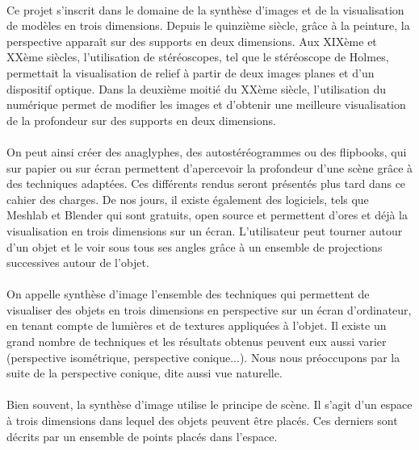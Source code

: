 \paragraph{}
	Ce projet s’inscrit dans le domaine de la synthèse d’images et de la visualisation de modèles en trois dimensions. Depuis le quinzième siècle, grâce à la peinture, la perspective apparaît sur des supports en deux dimensions. Aux XIXème et XXème siècles, l’utilisation de stéréoscopes, tel que le stéréoscope de Holmes, permettait la visualisation de relief à partir de deux images planes et d’un dispositif optique. Dans la deuxième moitié du XXème siècle, l’utilisation du numérique permet de modifier les images et d’obtenir une meilleure visualisation de la profondeur sur des supports en deux dimensions. 

\paragraph{}	
	On peut ainsi créer des anaglyphes, des autostéréogrammes ou des flipbooks, qui sur papier ou sur écran permettent d’apercevoir la profondeur d’une scène grâce à des techniques adaptées. Ces différents rendus seront présentés plus tard dans ce cahier des charges. De nos jours, il existe également des logiciels, tels que Meshlab et Blender qui sont gratuits, open source et permettent d’ores et déjà la visualisation en trois dimensions sur un écran. L’utilisateur peut tourner autour d’un objet et le voir sous tous ses angles grâce à un ensemble de projections successives autour de l’objet.

\paragraph{}
	On appelle synthèse d’image l'ensemble des techniques qui permettent de visualiser des objets en trois dimensions en perspective sur un écran d'ordinateur, en tenant compte de lumières et de textures appliquées à l'objet. Il existe un grand nombre de techniques et les résultats obtenus peuvent eux aussi varier (perspective isométrique, perspective conique...). Nous nous préoccupons par la suite de la perspective conique, dite aussi vue naturelle. 

\paragraph{}
	Bien souvent, la synthèse d'image utilise le principe de scène. Il s'agit d'un espace à trois dimensions dans lequel des objets peuvent être placés. Ces derniers sont décrits par un ensemble de points placés dans l'espace.

